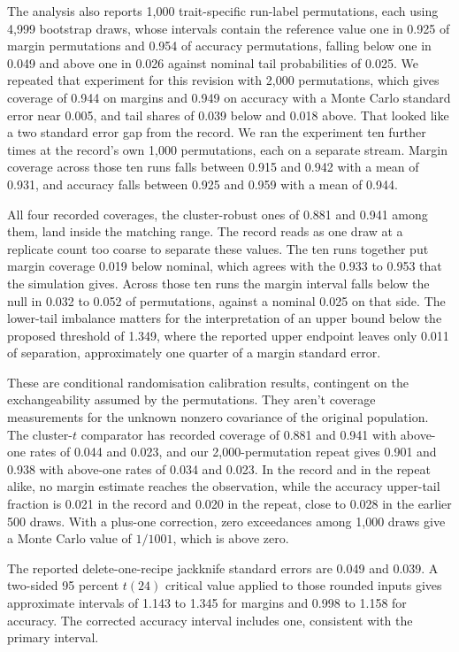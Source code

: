 The analysis also reports 1,000 trait-specific run-label permutations, each using 4,999 bootstrap draws, whose intervals contain the reference value one in 0.925 of margin permutations and 0.954 of accuracy permutations, falling below one in 0.049 and above one in 0.026 against nominal tail probabilities of 0.025. We repeated that experiment for this revision with 2,000 permutations, which gives coverage of 0.944 on margins and 0.949 on accuracy with a Monte Carlo standard error near 0.005, and tail shares of 0.039 below and 0.018 above. That looked like a two standard error gap from the record. We ran the experiment ten further times at the record's own 1,000 permutations, each on a separate stream. Margin coverage across those ten runs falls between 0.915 and 0.942 with a mean of 0.931, and accuracy falls between 0.925 and 0.959 with a mean of 0.944.

All four recorded coverages, the cluster-robust ones of 0.881 and 0.941 among them, land inside the matching range. The record reads as one draw at a replicate count too coarse to separate these values. The ten runs together put margin coverage 0.019 below nominal, which agrees with the 0.933 to 0.953 that the simulation gives. Across those ten runs the margin interval falls below the null in 0.032 to 0.052 of permutations, against a nominal 0.025 on that side. The lower-tail imbalance matters for the interpretation of an upper bound below the proposed threshold of 1.349, where the reported upper endpoint leaves only 0.011 of separation, approximately one quarter of a margin standard error.

These are conditional randomisation calibration results, contingent on the exchangeability assumed by the permutations. They aren't coverage measurements for the unknown nonzero covariance of the original population. The cluster-$t$ comparator has recorded coverage of 0.881 and 0.941 with above-one rates of 0.044 and 0.023, and our 2,000-permutation repeat gives 0.901 and 0.938 with above-one rates of 0.034 and 0.023. In the record and in the repeat alike, no margin estimate reaches the observation, while the accuracy upper-tail fraction is 0.021 in the record and 0.020 in the repeat, close to 0.028 in the earlier 500 draws. With a plus-one correction, zero exceedances among 1,000 draws give a Monte Carlo value of $1/1001$, which is above zero.

The reported delete-one-recipe jackknife standard errors are 0.049 and 0.039. A two-sided 95 percent $t(24)$ critical value applied to those rounded inputs gives approximate intervals of 1.143 to 1.345 for margins and 0.998 to 1.158 for accuracy. The corrected accuracy interval includes one, consistent with the primary interval.

